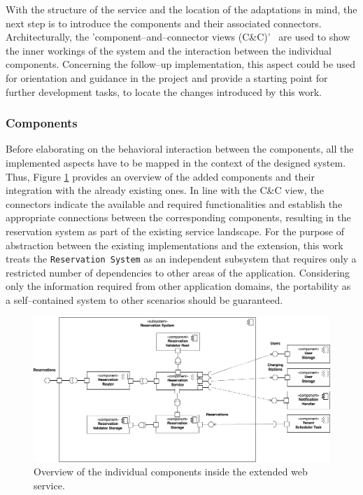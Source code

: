 \noindent With the structure of the service and the location of the adaptations in mind, the next step is to introduce the components and their associated connectors. 
Architecturally, the 'component--and--connector views (C\&C)'~\cite[p.~136]{clements_documenting_2011} are used to show the inner workings of the system and the interaction between the individual components. 
Concerning the follow--up implementation, this aspect could be used for orientation and guidance in the project and provide a starting point for further development tasks, to locate the changes introduced by this work.

\subsubsection{Components}
\label{ch:Implementation:sec:Reservation System:ssec:Architectural Views:sssec:Components}

Before elaborating on the behavioral interaction between the components, all the implemented aspects have to be mapped in the context of the designed system. Thus, Figure \ref{fig:component-view} provides an overview of the added components and their integration with the already existing ones.
In line with the C\&C view, the connectors indicate the available and required functionalities and establish the appropriate connections between the corresponding components, resulting in the reservation system as part of the existing service landscape.
For the purpose of abstraction between the existing implementations and the extension, this work treats the \texttt{Reservation System} as an independent subsystem that requires only a restricted number of dependencies to other areas of the application.
Considering only the information required from other application domains, the portability as a self--contained system to other scenarios should be guaranteed.

\begin{figure}[h]
    \centering
    \includegraphics[scale=0.4]{resources/images/main/6_implementation/ReservationComponents.png}
    \caption{Overview of the individual components inside the extended web service.}
    \label{fig:component-view}
\end{figure}

